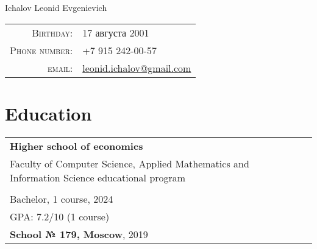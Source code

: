 \documentclass[a4paper,11pt]{article}
\begin{document}


\pagestyle{empty} %


\par{\centering
		{\Huge Ichalov Leonid Evgenievich
	}\bigskip\par}

\begin{center}
\hspace{0.7cm}\begin{tabular}{rl}
    \textsc{Birthday:} &  17 августа 2001 \\
    \textsc{Phone number:}     & +7 915 242-00-57\\
    \textsc{email:}     & \href{mailto:leonid.ichalov@gmail.com}{leonid.ichalov@gmail.com}
\end{tabular}
\end{center}
\section{Education}

\vspace{5px}
\begin{tabular}{lr}
\textbf{\large Higher school of economics}\\
Faculty of Computer Science, Applied Mathematics and Information Science educational program\\\hspace{14.35cm} \\
\hspace{0.5cm}Bachelor, 1 course, 2024\\
\hspace{1cm}GPA: 7.2/10 (1 course)\\
\textbf{School № 179, Moscow}, 2019\\
\end{tabular}
\\
\end{document}
